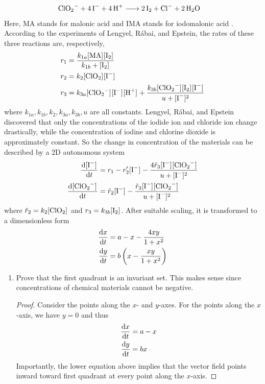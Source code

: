 \documentclass[../psets.tex]{subfiles}
\begin{document}
\begin{enumerate}
\begin{align*}
        \ce{ClO2- + 4I- + 4H+} &\ce{->} \ce{2I2 + Cl- + 2H2O}
    \end{align*}
    Here, MA stands for malonic acid  and IMA stands for iodomalonic acid . According to the experiments of Lengyel, R\'{a}bai, and Epstein, the rates of these three reactions are, respectively,
    \begin{align*}
        r_1 &= \frac{k_{1a}\cnc{MA}\cnc{I2}}{k_{1b}+\cnc{I2}}\\
        r_2 &= k_2\cnc{ClO2}\cnc{I-}\\
        r_3 &= k_{3a}\cnc{ClO2-}\cnc{I-}\cnc{H+}+\frac{k_{3b}\cnc{ClO2-}\cnc{I2}\cnc{I-}}{u+\cnc{I-}^2}
    \end{align*}
    where $k_{1a},k_{1b},k_2,k_{3a},k_{3b},u$ are all constants. Lengyel, R\'{a}bai, and Epstein discovered that only the concentrations of the iodide ion and chloride ion change drastically, while the concentration of iodine and chlorine dioxide is approximately constant. So the change in concentration of the materials can be described by a 2D autonomous system
    \begin{align*}
        \dv{\cnc{I-}}{t} &= r_1-r_2'\cnc{I-}-\frac{4\tilde{r}_3\cnc{I-}\cnc{ClO2-}}{u+\cnc{I-}^2}\\
        \dv{\cnc{ClO2-}}{t} &= \tilde{r}_2\cnc{I-}-\frac{\tilde{r}_3\cnc{I-}\cnc{ClO2-}}{u+\cnc{I-}^2}
    \end{align*}
    where $\tilde{r}_2=k_2\cnc{ClO2}$ and $r_3=k_{3b}\cnc{I2}$. After suitable scaling, it is transformed to a dimensionless form
    \begin{align*}
        \dv{x}{t} &= a-x-\frac{4xy}{1+x^2}\\
        \dv{y}{t} &= b\left( x-\frac{xy}{1+x^2} \right)
    \end{align*}
    \begin{enumerate}
        \item Prove that the first quadrant is an invariant set. This makes sense since concentrations of chemical materials cannot be negative.
        \begin{proof}
            Consider the points along the $x$- and $y$-axes. For the points along the $x$-axis, we have $y=0$ and thus
            \begin{align*}
                \dv{x}{t} &= a-x\\
                \dv{y}{t} &= bx
            \end{align*}
            Importantly, the lower equation above implies that the vector field points inward toward first quadrant at every point along the $x$-axis.\par

\end{proof}
\end{enumerate}
\end{enumerate}
\end{document}
